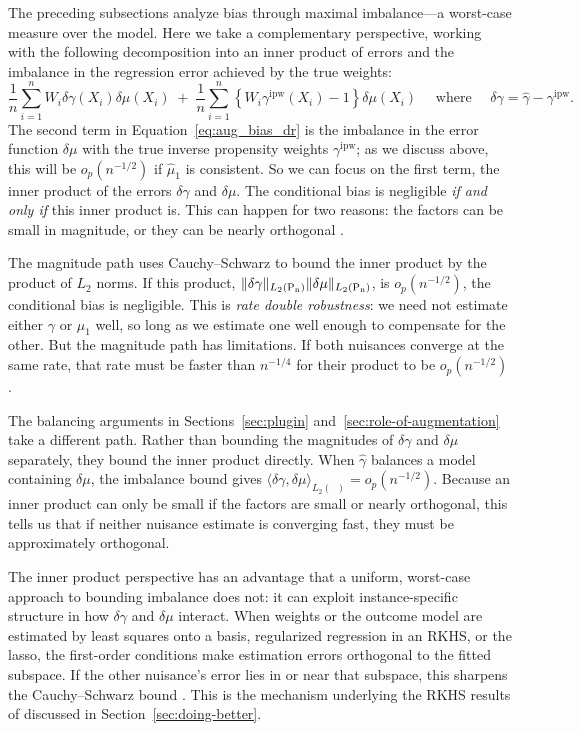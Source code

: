 \documentclass{article}
\DeclarePairedDelimiter\norm{\lVert}{\rVert}
\theoremstyle{definition}
\newcommand{\ipw}{\text{ipw}}
\newcommand{\dgamma}{\delta\gamma}
\newcommand{\dm}{\delta \mu}
\DeclareMathOperator{\Pn}{P_n}
\newcommand{\hgamma}{\ensuremath{\hat\gamma}}
\newcommand{\gammaipw}{\ensuremath{\gamma^{\ipw}}}
\newcommand{\<}{\langle}
\renewcommand{\>}{\rangle}
\begin{document}
The preceding subsections analyze bias through maximal imbalance---a worst-case measure over the model. Here we take a complementary perspective, working with the following decomposition into an inner product of errors and the imbalance in the regression error achieved by the true weights:
\begin{equation}
    \label{eq:aug_bias_dr}
    \frac{1}{n}\sum_{i=1}^nW_i \delta\gamma(X_i) \dm(X_i) \;+\; \frac{1}{n}\sum_{i=1}^n \left\{W_i \gammaipw(X_i) - 1\right\}\dm(X_i) \quad \text{ where } \quad  \delta\gamma = \hat{\gamma}  - \gammaipw.
\end{equation}
The second term in Equation~\ref{eq:aug_bias_dr} is the imbalance in the error function $\dm$ with the true
inverse propensity weights $\gammaipw$; as we discuss above, this will be $o_p(n^{-1/2})$ if $\hat \mu_1$ is consistent.
So we can focus on the first term, the inner product of the errors $\dgamma$ and $\dm$. The conditional bias is negligible \emph{if and only if} this inner product is. This can happen for two reasons: the factors can be small in magnitude, or they can be nearly orthogonal \citep[Section 1.4]{hirshberg2021augmented}.

The magnitude path uses Cauchy--Schwarz to bound the inner product by the product of $L_2$ norms. If this product, $\norm{\delta\gamma}_{L_2(\Pn)}\norm{\dm}_{L_2(\Pn)}$, is $o_p(n^{-1/2})$, the conditional bias is negligible. This is \emph{rate double robustness}: we need not estimate either $\gamma$ or $\mu_1$ well, so long as we estimate one well enough to compensate for the other. But the magnitude path has limitations. If both nuisances converge at the same rate, that rate must be faster than $n^{-1/4}$ for their product to be $o_p(n^{-1/2})$.

The balancing arguments in Sections~\ref{sec:plugin} and~\ref{sec:role-of-augmentation} take a different path. Rather than bounding the magnitudes of $\dgamma$ and $\dm$ separately, they bound the inner product directly. When $\hgamma$ balances a model containing $\dm$, the imbalance bound gives $\langle \dgamma, \dm \rangle_{L_2(\Pn)} = o_p(n^{-1/2})$. Because an inner product can only be small if the factors are small or nearly orthogonal, this tells us that if neither nuisance estimate is converging fast, they must be approximately orthogonal.

The inner product perspective has an advantage that a uniform, worst-case approach to bounding imbalance does not: it can exploit instance-specific structure in how $\dgamma$ and $\dm$ interact. When weights or the outcome model are estimated by least squares onto a basis, regularized regression in an RKHS, or the lasso, the first-order conditions make estimation errors orthogonal to the fitted subspace. If the other nuisance's error lies in or near that subspace, this sharpens the Cauchy--Schwarz bound \citep{vermeulen2015bias,tan2010bounded,hirshberg2019minimax,bradic2019sparsity}. This is the mechanism underlying the RKHS results of \citet{hirshberg2019minimax} discussed in Section~\ref{sec:doing-better}.
\end{document}
